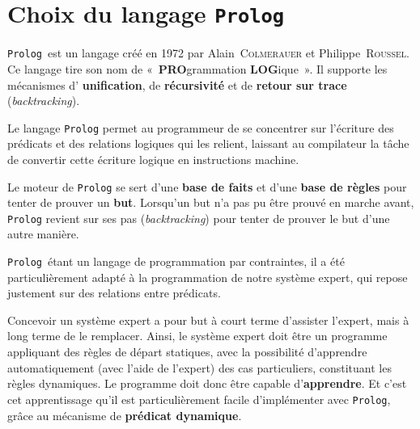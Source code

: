 \chapter{Choix du langage \texttt{Prolog}}
\texttt{Prolog} est un langage créé en 1972 par Alain~\textsc{Colmerauer} et Philippe~\textsc{Roussel}. Ce langage tire son nom de «~\textbf{PRO}grammation \textbf{LOG}ique~». Il supporte les mécanismes d' \textbf{unification}, de \textbf{récursivité} et de \textbf{retour sur trace} (\textit{backtracking}).

Le langage \texttt{Prolog} permet au programmeur de se concentrer sur l'écriture des prédicats et des relations logiques qui les relient, laissant au compilateur la tâche de convertir cette écriture logique en instructions machine.

Le moteur de \texttt{Prolog} se sert d'une \textbf{base de faits} et d'une \textbf{base de règles} pour tenter de prouver un \textbf{but}. Lorsqu'un but n'a pas pu être prouvé en marche avant, \texttt{Prolog} revient sur ses pas (\textit{backtracking}) pour tenter de prouver le but d'une autre manière.

\texttt{Prolog} étant un langage de programmation par contraintes, il a été particulièrement adapté à la programmation de notre système expert, qui repose justement sur des relations entre prédicats.

Concevoir un système expert a pour but à court terme d'assister l'expert, mais à long terme de le remplacer. Ainsi, le système expert doit être un programme appliquant des règles de départ statiques, avec la possibilité d'apprendre automatiquement (avec l'aide de l'expert) des cas particuliers, constituant les règles dynamiques. Le programme doit donc être capable d'\textbf{apprendre}. Et c'est cet apprentissage qu'il est particulièrement facile d'implémenter avec \texttt{Prolog}, grâce au mécanisme de \textbf{prédicat dynamique}.
